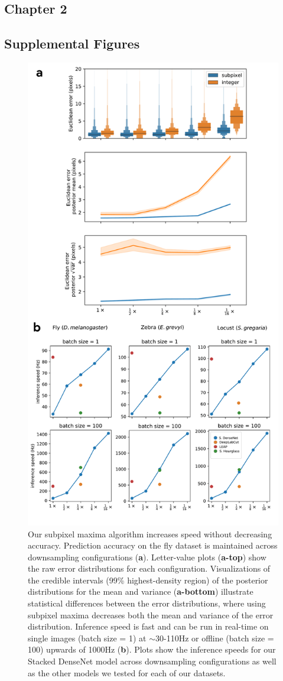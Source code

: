 \documentclass[11pt,a4paper,oneside]{article}
\begin{document}
\begin{appendices}
\section{Chapter 2}
\subsection{Supplemental Figures}
    \label{app:figures}
    \begin{figure}
    
    \centering
    \includegraphics[width=0.60\linewidth]{Graving_IMPRS_Thesis/figures/downsample_inference_speed.pdf}
    \caption{Our subpixel maxima algorithm increases speed without decreasing accuracy. Prediction accuracy on the fly dataset is maintained across downsampling configurations (\textbf{a}). Letter-value plots (\textbf{a-top}) show the raw error distributions for each configuration. Visualizations of the credible intervals (99\% highest-density region) of the posterior distributions for the mean and variance (\textbf{a-bottom}) illustrate statistical differences between the error distributions, where using subpixel maxima decreases both the mean and variance of the error distribution. Inference speed is fast and can be run in real-time on single images (batch size = 1) at $\sim$30-110Hz or offline (batch size = 100) upwards of 1000Hz (\textbf{b}). Plots show the inference speeds for our Stacked DenseNet model across downsampling configurations as well as the other models we tested for each of our datasets. }
    \label{fig:downsample_inference_speed}
    

\end{figure}
\end{appendices}
\end{document}
